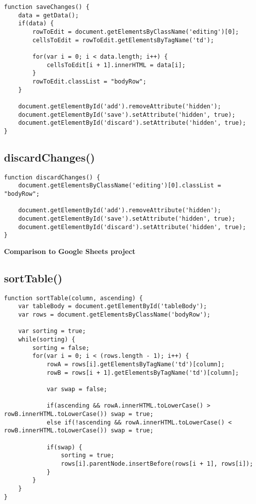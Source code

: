 \documentclass[letterpaper]{article}
\begin{document}
\begin{lstlisting}[firstnumber=197]
function saveChanges() {
    data = getData();
    if(data) {
        rowToEdit = document.getElementsByClassName('editing')[0];
        cellsToEdit = rowToEdit.getElementsByTagName('td');

        for(var i = 0; i < data.length; i++) {
            cellsToEdit[i + 1].innerHTML = data[i];
        }
        rowToEdit.classList = "bodyRow";
    }

    document.getElementById('add').removeAttribute('hidden');
    document.getElementById('save').setAttribute('hidden', true);
    document.getElementById('discard').setAttribute('hidden', true);
}
\end{lstlisting}

\subsection{discardChanges()}

\begin{lstlisting}[firstnumber=214]
function discardChanges() {
    document.getElementsByClassName('editing')[0].classList = "bodyRow";

    document.getElementById('add').removeAttribute('hidden');
    document.getElementById('save').setAttribute('hidden', true);
    document.getElementById('discard').setAttribute('hidden', true);
}
\end{lstlisting}

\textbf{Comparison to Google Sheets project}

\subsection{sortTable()}

\begin{lstlisting}[firstnumber=222]
function sortTable(column, ascending) {
    var tableBody = document.getElementById('tableBody');
    var rows = document.getElementsByClassName('bodyRow');

    var sorting = true;
    while(sorting) {
        sorting = false;
        for(var i = 0; i < (rows.length - 1); i++) {
            rowA = rows[i].getElementsByTagName('td')[column];
            rowB = rows[i + 1].getElementsByTagName('td')[column];

            var swap = false;

            if(ascending && rowA.innerHTML.toLowerCase() > rowB.innerHTML.toLowerCase()) swap = true;
            else if(!ascending && rowA.innerHTML.toLowerCase() < rowB.innerHTML.toLowerCase()) swap = true;

            if(swap) {
                sorting = true;
                rows[i].parentNode.insertBefore(rows[i + 1], rows[i]);
            }
        }
    }
}
\end{lstlisting}
\end{document}
